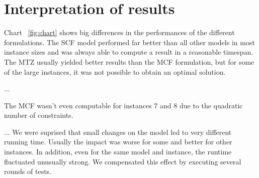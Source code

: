 \documentclass[,%
			paper=a4,%
			DIV14,
			liststotoc,
			bibtotoc,
			draft=false,%
			numbers=noendperiod
			]{scrartcl}
\begin{document}
\section{Interpretation of results}
Chart ~\ref{fig:chart} shows big differences in the performances of the different formulations. The SCF model performed far better than all other models in most instance sizes and was always able to compute a result in a reasonable timespan. The MTZ usually yielded better results than the MCF formulation, but for some of the large instances, it was not possible to obtain an optimal solution.

...

The MCF wasn't even computable for instances 7 and 8 due to the quadratic number of constraints. 

...
We were suprised that small changes on the model led to very different running time. Usually the impact was worse for some and better for other instances.
In addition, even for the same model and instance, the runtime fluctuated unusually strong.
We compensated this effect by executing several rounds of tests.
\end{document}
